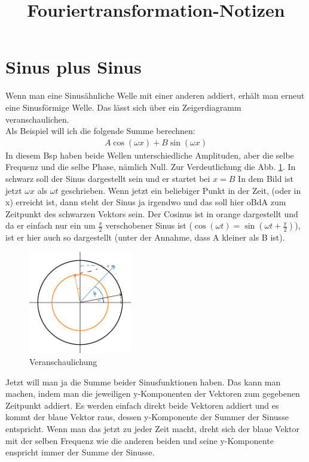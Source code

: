 \documentclass[paper=a4,10pt]{scrartcl}
\title{Fouriertransformation-Notizen}
\begin{document}
\maketitle
\newpage
\tableofcontents
\newpage
{}
\setcounter{page}{1}

\section{Sinus plus Sinus}
Wenn man eine Sinusähnliche Welle mit einer anderen addiert, erhält man erneut eine Sinusförmige Welle. Das lässt sich über ein Zeigerdiagramm veranschaulichen. \\
\noindent
Als Beispiel will ich die folgende Summe berechnen:
\begin{align}
	A \cos(\omega x) + B \sin(\omega x)
\end{align}
In diesem Bsp haben beide Wellen unterschiedliche Amplituden, aber die selbe Frequenz und die selbe Phase, nämlich Null. Zur Verdeutlichung die Abb. \ref{fig:sps}. In schwarz soll der Sinus dargestellt sein und er startet bei $x=B$ In dem Bild ist jetzt $\omega x$ als $\omega t$ geschrieben. Wenn jetzt ein beliebiger Punkt in der Zeit, (oder in x) erreicht ist, dann steht der Sinus ja irgendwo und das soll hier oBdA zum Zeitpunkt des schwarzen Vektors sein. Der Cosinus ist in orange dargestellt und da er einfach nur ein um $\frac{\pi}{2}$ verschobener Sinus ist ($\cos(\omega t) = \sin(\omega t + \frac{\pi}{2})$), ist er hier auch so dargestellt (unter der Annahme, dass A kleiner als B ist).
\begin{figure}[H]
	\centering
	\includegraphics[width=0.4\textwidth]{./bilder/sinus_plus_sinus.png}
	\caption{Veranschaulichung}
	\label{fig:sps}
\end{figure}
\noindent
Jetzt will man ja die Summe beider Sinusfunktionen haben. Das kann man machen, indem man die jeweiligen y-Komponenten der Vektoren zum gegebenen Zeitpunkt addiert. Es werden einfach direkt beide Vektoren addiert und es kommt der blaue Vektor raus, dessen y-Komponente der Summer der Sinusse entspricht. Wenn man das jetzt zu jeder Zeit macht, dreht sich der blaue Vektor mit der selben Frequenz wie die anderen beiden und seine y-Komponente enspricht immer der Summe der Sinusse. \\
\end{document}
